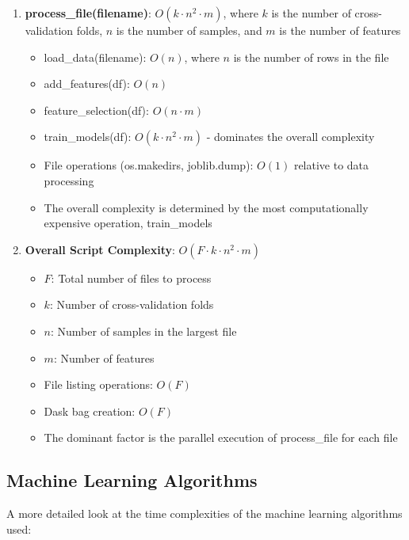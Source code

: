 \documentclass[11pt,a4paper]{article}
\begin{document}
\begin{enumerate}
    \item \textbf{process\_file(filename)}: $O(k \cdot n^2 \cdot m)$, where $k$ is the number of cross-validation folds, $n$ is the number of samples, and $m$ is the number of features
    \begin{itemize}
        \item load\_data(filename): $O(n)$, where $n$ is the number of rows in the file
        \item add\_features(df): $O(n)$
        \item feature\_selection(df): $O(n \cdot m)$
        \item train\_models(df): $O(k \cdot n^2 \cdot m)$ - dominates the overall complexity
        \item File operations (os.makedirs, joblib.dump): $O(1)$ relative to data processing
        \item The overall complexity is determined by the most computationally expensive operation, train\_models
    \end{itemize}

    \item \textbf{Overall Script Complexity}: $O(F \cdot k \cdot n^2 \cdot m)$
    \begin{itemize}
        \item $F$: Total number of files to process
        \item $k$: Number of cross-validation folds
        \item $n$: Number of samples in the largest file
        \item $m$: Number of features
    \end{itemize}
    \begin{itemize}
        \item File listing operations: $O(F)$
        \item Dask bag creation: $O(F)$
        \item The dominant factor is the parallel execution of process\_file for each file
    \end{itemize}
\end{enumerate}

\subsection{Machine Learning Algorithms}
A more detailed look at the time complexities of the machine learning algorithms used:
\end{document}
